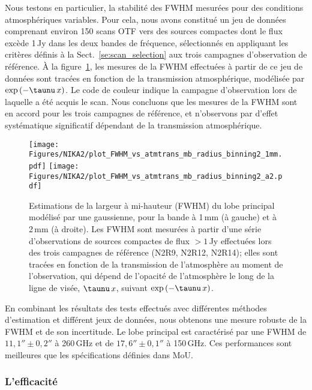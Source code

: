 Nous testons en particulier, la stabilité des FWHM mesurées pour des
conditions atmosphériques variables. Pour cela, nous avons constitué
un jeu de données comprenant environ 150 scans OTF vers des sources
compactes dont le flux excède 1\,Jy dans les deux bandes de fréquence,
sélectionnés en appliquant les critères définis à la
Sect.~\ref{se:scan_selection} aux trois campagnes d'observation de
référence. \`A la figure~\ref{fig:fwhm_map_atmtrans}, les mesures de
la FWHM effectuées à partir de ce jeu de données sont tracées en
fonction de la transmission atmosphérique, modélisée par
$\exp{(-\taunu\,x)}$. Le code de couleur indique la campagne
d'observation lors de laquelle a été acquis le scan. Nous concluons
que les mesures de la FWHM sont en accord pour les trois campagnes de
référence, et n'observons par d'effet systématique significatif
dépendant de la transmission atmosphérique.
%
\begin{figure}[!thbp]
\begin{center}
  \texttt{[image: Figures/NIKA2/plot\_FWHM\_vs\_atmtrans\_mb\_radius\_binning2\_1mm.pdf]}
  \texttt{[image: Figures/NIKA2/plot\_FWHM\_vs\_atmtrans\_mb\_radius\_binning2\_a2.pdf]}
  \caption[Main Beam FWHM]{Estimations de la largeur à mi-hauteur
    (FWHM) du lobe principal modélisé par une gaussienne, pour la bande à 1\,mm
    (à gauche) et à 2\,mm (à droite). Les FWHM sont mesurées à partir
    d'une série d'observations de sources compactes de flux $>1\,$Jy
    effectuées lors des trois campagnes de référence (N2R9, N2R12,
    N2R14); elles sont tracées en fonction de la transmission de
    l'atmosphère au moment de l'observation, qui dépend de l'opacité
    de l'atmosphère le long de la ligne de visée, $\taunu \, x$,
    suivant $\exp{(-\taunu \, x)}$. }
\label{fig:fwhm_map_atmtrans}
\end{center}
\end{figure}
%
En combinant les résultats des tests effectués avec différentes
méthodes d'estimation et différent jeux de données, nous obtenons une
mesure robuste de la FWHM et de son incertitude. Le lobe principal est
caractérisé par une FWHM de $11,1'' \pm 0,2''$ à 260\,GHz et de
$17,6'' \pm 0,1''$ à 150\,GHz. Ces performances sont meilleures que
les spécifications définies dans MoU. 


\subsubsection{L'efficacité}

